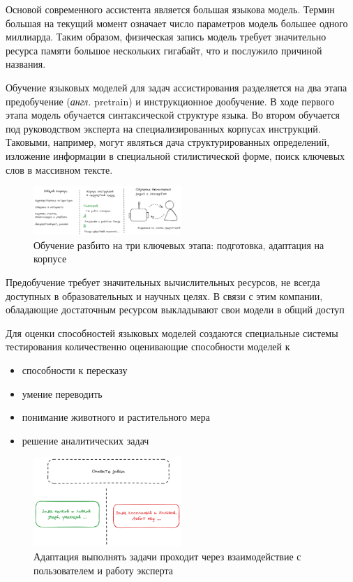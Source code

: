 Основой современного ассистента является большая языкова модель. Термин большая на текущий момент
означает число параметров модель большее одного миллиарда. Таким образом, физическая запись модель требует
значительно ресурса памяти большое нескольких гигабайт, что и послужило причиной названия.  

Обучение языковых моделей для задач ассистирования разделяется на два этапа предобучение (\textit{англ.} pretrain) и инструкционное дообучение.
В ходе первого этапа модель обучается синтаксической структуре языка. 
Во втором обучается под руководством эксперта на специализированных корпусах инструкций. Таковыми, например, могут являться
дача структурированных определений, изложение информации в специальной стилистической форме, поиск ключевых слов в массивном тексте.

\begin{figure}[h]
    \centering
    \includegraphics[width=0.5\textwidth]{assets/work/arch/learning.excalidraw.png}
    \caption{Обучение разбито на три ключевых этапа: подготовка, адаптация на корпусе}
    \label{train}
\end{figure}


Предобучение требует значительных вычислительных ресурсов, 
не всегда доступных в образовательных и научных
целях. В связи с этим компании, обладающие достаточным
ресурсом выкладывают свои модели в общий доступ \cite{jiang2023mistral}\cite{jiang2024mixtral}\cite{touvron2023llama}


Для оценки способностей языковых моделей создаются специальные системы тестирования количественно оценивающие способности моделей к \begin{itemize}
    \item способности к пересказу
    \item умение переводить
    \item понимание животного и растительного мера 
    \item решение аналитических задач 
\end{itemize}


\begin{figure}[h]
    \centering
    \includegraphics[width=0.5\textwidth]{assets/work/arch/instruction.excalidraw.png}
    \caption{Адаптация выполнять задачи проходит через взаимодействие с пользователем и работу эксперта}
    \label{instruction}
\end{figure}

